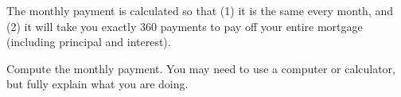 \documentclass[12pt]{article}
\begin{document}
The monthly payment is calculated so that (1) it is the same every 
month, and (2) it will take you exactly 360 payments to pay off 
your entire mortgage (including principal and interest).

Compute the monthly payment. You may need to 
use a computer or calculator, but fully explain what you are doing.
\end{document}
